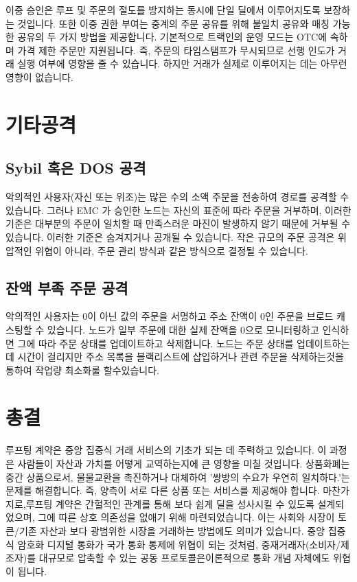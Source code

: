 \documentclass{article}
\begin{document}
\begin{multicols}{2}
\begin{itemize}
\end{itemize}

\indent 이중 승인은 루프 및 주문의 절도를 방지하는 동시에 단일 딜에서 이루어지도록 보장하는 것입니다. 또한 이중 권한 부여는 중계의 주문 공유를 위해 불일치 공유와 매칭 가능한 공유의 두 가지 방법을 제공합니다. 기본적으로 트랙인의 운영 모드는 OTC에 속하며 가격 제한 주문만 지원됩니다. 즉, 주문의 타임스탬프가 무시되므로 선행 인도가 거래 실행 여부에 영향을 줄 수 있습니다. 하지만 거래가 실제로 이루어지는 데는 아무런 영향이 없습니다.

\section{기타공격}

\subsection{Sybil 혹은 DOS 공격}
\indent 악의적인 사용자(자신 또는 위조)는 많은 수의 소액 주문을 전송하여 경로를 공격할 수 있습니다. 그러나 EMC 가 승인한 노드는 자신의 표준에 따라 주문을 거부하며, 이러한 기준은 대부분의 주문이 일치할 때 만족스러운 마진이 발생하지 않기 때문에 거부될 수 있습니다. 이러한 기준은 숨겨지거나 공개될 수 있습니다. 작은 규모의 주문 공격은 위압적인 위협이 아니라, 주문 관리 방식과 같은 방식으로 결정될 수 있습니다.

\subsection{잔액 부족 주문 공격}
\indent 악의적인 사용자는 0이 아닌 값의 주문을 서명하고 주소 잔액이 0인 주문을 브로드 캐스팅할 수 있습니다. 노드가 일부 주문에 대한 실제 잔액을 0으로 모니터링하고 인식하면 그에 따라 주문 상태를 업데이트하고 삭제합니다. 노드는 주문 상태를 업데이트하는 데 시간이 걸리지만 주소 목록을 블랙리스트에 삽입하거나 관련 주문을 삭제하는것을 통하여 작업량 최소화룰 할수있습니다.

\section{총결}

\indent 루프팅 계약은 중앙 집중식 거래 서비스의 기초가 되는 데 주력하고 있습니다. 이 과정은 사람들이 자산과 가치를 어떻게 교역하는지에 큰 영향을 미칠 것입니다. 상품화폐는 중간 상품으로서, 물물교환을 촉진하거나 대체하여 '쌍방의 수요가 우연히 일치하다.'는 문제를 해결합니다.\cite{unenumerated2006} 즉, 양측이 서로 다른 상품 또는 서비스를 제공해야 합니다. 마찬가지로,루프팅 계약은 간헐적인 관계를 통해 보다 쉽게 딜을 성사시킬 수 있도록 설계되었으며, 그에 따른 상호 의존성을 없애기 위해 마련되었습니다. 이는 사회와 시장이 토큰/기존 자산과 보다 광범위한 시장을 거래하는 방법에도 의미가 있습니다. 중앙 집중식 암호화 디지털 통화가 국가 통화 통제에 위협이 되는 것처럼, 중재거래자(소비자/제조자)를 대규모로 압축할 수 있는 공동 프로토콜은이론적으로 통화 개념 자체에도 위협이 됩니다.


\end{multicols}
\end{document}

